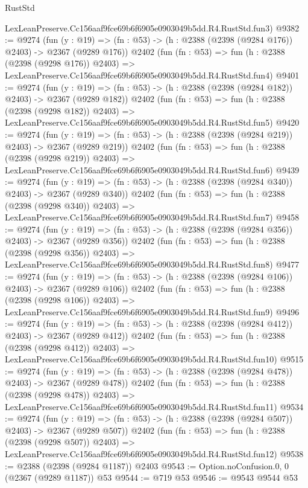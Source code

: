 \begin{lexlean}{RustStd}
\begin{coremodule}
    LexLeanPreserve.Cc156aaf9fce69b6f6905e0903049b5dd.R4.RustStd.fun3)
@9382 := @9274
    (fun (y : @19) => (fn : @53) -> (h : @2388 (@2398 (@9284 @176)) @2403) -> @2367 (@9289 @176))
    @2402
    (fun (fn : @53) =>
    fun (h : @2388 (@2398 (@9298 @176)) @2403) =>
    LexLeanPreserve.Cc156aaf9fce69b6f6905e0903049b5dd.R4.RustStd.fun4)
@9401 := @9274
    (fun (y : @19) => (fn : @53) -> (h : @2388 (@2398 (@9284 @182)) @2403) -> @2367 (@9289 @182))
    @2402
    (fun (fn : @53) =>
    fun (h : @2388 (@2398 (@9298 @182)) @2403) =>
    LexLeanPreserve.Cc156aaf9fce69b6f6905e0903049b5dd.R4.RustStd.fun5)
@9420 := @9274
    (fun (y : @19) => (fn : @53) -> (h : @2388 (@2398 (@9284 @219)) @2403) -> @2367 (@9289 @219))
    @2402
    (fun (fn : @53) =>
    fun (h : @2388 (@2398 (@9298 @219)) @2403) =>
    LexLeanPreserve.Cc156aaf9fce69b6f6905e0903049b5dd.R4.RustStd.fun6)
@9439 := @9274
    (fun (y : @19) => (fn : @53) -> (h : @2388 (@2398 (@9284 @340)) @2403) -> @2367 (@9289 @340))
    @2402
    (fun (fn : @53) =>
    fun (h : @2388 (@2398 (@9298 @340)) @2403) =>
    LexLeanPreserve.Cc156aaf9fce69b6f6905e0903049b5dd.R4.RustStd.fun7)
@9458 := @9274
    (fun (y : @19) => (fn : @53) -> (h : @2388 (@2398 (@9284 @356)) @2403) -> @2367 (@9289 @356))
    @2402
    (fun (fn : @53) =>
    fun (h : @2388 (@2398 (@9298 @356)) @2403) =>
    LexLeanPreserve.Cc156aaf9fce69b6f6905e0903049b5dd.R4.RustStd.fun8)
@9477 := @9274
    (fun (y : @19) => (fn : @53) -> (h : @2388 (@2398 (@9284 @106)) @2403) -> @2367 (@9289 @106))
    @2402
    (fun (fn : @53) =>
    fun (h : @2388 (@2398 (@9298 @106)) @2403) =>
    LexLeanPreserve.Cc156aaf9fce69b6f6905e0903049b5dd.R4.RustStd.fun9)
@9496 := @9274
    (fun (y : @19) => (fn : @53) -> (h : @2388 (@2398 (@9284 @412)) @2403) -> @2367 (@9289 @412))
    @2402
    (fun (fn : @53) =>
    fun (h : @2388 (@2398 (@9298 @412)) @2403) =>
    LexLeanPreserve.Cc156aaf9fce69b6f6905e0903049b5dd.R4.RustStd.fun10)
@9515 := @9274
    (fun (y : @19) => (fn : @53) -> (h : @2388 (@2398 (@9284 @478)) @2403) -> @2367 (@9289 @478))
    @2402
    (fun (fn : @53) =>
    fun (h : @2388 (@2398 (@9298 @478)) @2403) =>
    LexLeanPreserve.Cc156aaf9fce69b6f6905e0903049b5dd.R4.RustStd.fun11)
@9534 := @9274
    (fun (y : @19) => (fn : @53) -> (h : @2388 (@2398 (@9284 @507)) @2403) -> @2367 (@9289 @507))
    @2402
    (fun (fn : @53) =>
    fun (h : @2388 (@2398 (@9298 @507)) @2403) =>
    LexLeanPreserve.Cc156aaf9fce69b6f6905e0903049b5dd.R4.RustStd.fun12)
@9538 := @2388 (@2398 (@9284 @1187)) @2403
@9543 := Option.noConfusion.{0, 0} (@2367 (@9289 @1187)) @53
@9544 := @719 @53
@9546 := @9543 @9544 @53

\end{coremodule}
\end{lexlean}
